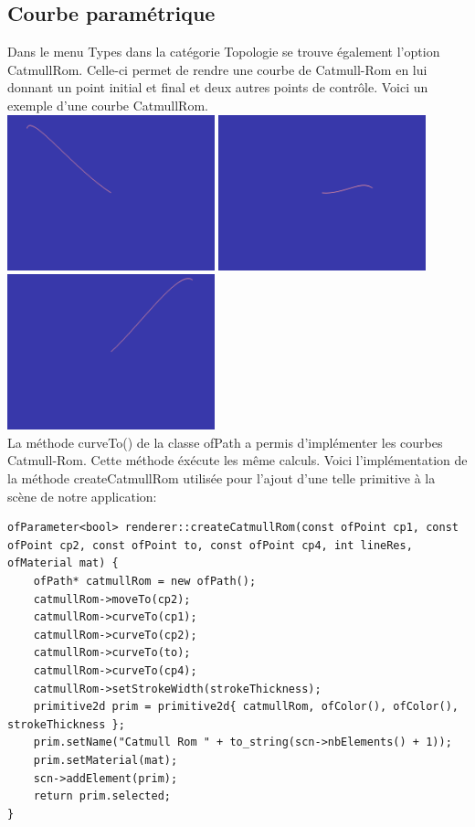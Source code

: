 \subsection{Courbe paramétrique}
Dans le menu Types dans la catégorie Topologie se trouve également l'option CatmullRom. Celle-ci permet de rendre une courbe de Catmull-Rom en lui donnant un point initial et final et deux autres points de contrôle. Voici un exemple d'une courbe CatmullRom. \\
\includegraphics[width=6cm]{fig/catmullrom1.png}
\includegraphics[width=6cm]{fig/catmullrom2.png}
\includegraphics[width=6cm]{fig/catmullrom3.png} \\
La méthode curveTo() de la classe ofPath a permis d'implémenter les courbes Catmull-Rom. Cette méthode éxécute les même calculs. Voici l'implémentation de la méthode createCatmullRom utilisée pour l'ajout d'une telle primitive à la scène de notre application:\\
\begin{lstlisting}
ofParameter<bool> renderer::createCatmullRom(const ofPoint cp1, const ofPoint cp2, const ofPoint to, const ofPoint cp4, int lineRes, ofMaterial mat) {
	ofPath* catmullRom = new ofPath();
	catmullRom->moveTo(cp2);
	catmullRom->curveTo(cp1);
	catmullRom->curveTo(cp2);
	catmullRom->curveTo(to);
	catmullRom->curveTo(cp4);
	catmullRom->setStrokeWidth(strokeThickness);
	primitive2d prim = primitive2d{ catmullRom, ofColor(), ofColor(), strokeThickness };
	prim.setName("Catmull Rom " + to_string(scn->nbElements() + 1));
	prim.setMaterial(mat);
	scn->addElement(prim);
	return prim.selected;
}
\end{lstlisting}

